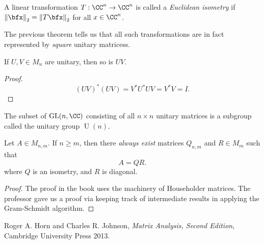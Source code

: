 \documentclass{article}
\newcommand{\norm}[1]{\ensuremath{\left\lVert{#1}\right\rVert}}
\DeclareMathOperator{\GL}{GL}
\DeclareMathOperator{\U}{U}
\begin{document}
\begin{definition}
    A linear transformation $T: \CC^n \to \CC^n$ is called a \textit{Euclidean isometry} if $\norm{\bfx}_2 = \norm{T\bfx}_2$ for all $x \in \CC^n$.
\end{definition}

The previous theorem tells us that all such transformations are in fact represented by \textit{square} unitary matricess.

\begin{remark}
    If $U,V \in M_n$ are unitary, then so is $UV$.
\end{remark}

\begin{proof}
    \[
        (UV)^\ast (UV) = V^\ast U^\ast U V = V^\ast V = I.
    \]
\end{proof}

\begin{definition}
    The subset of $\GL(n, \CC)$ consisting of all $n \times n$ unitary matrices is a subgroup called the unitary group $\U(n)$.
\end{definition}

\begin{theorem}[QR factorization]
    Let $A \in M_{n,m}$.
    If $n \geq m$, then there \textit{always exist} matrices $Q_{n,m}$ and $R \in M_m$ such that
    \[
        A = QR.
    \]
    where $Q$ is an isometry, and $R$ is diagonal.
\end{theorem}

\begin{proof}
    The proof in the book uses the machinery of Householder matrices.
    The professor gave us a proof via keeping track of intermediate results in applying the Gram-Schmidt algorithm.
\end{proof}





\begin{thebibliography}{999999}
    \raggedright\footnotesize

    Roger A. Horn and Charles R. Johnson, \textit{Matrix Analysis, Second Edition}, Cambridge University Press 2013.

\end{thebibliography}
\end{document}

